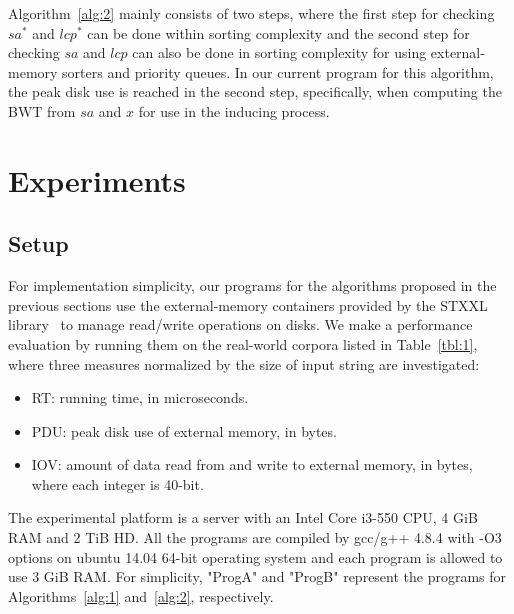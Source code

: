 \documentclass[10pt,journal,compsoc]{IEEEtran}
\begin{document}
Algorithm~\ref{alg:2} mainly consists of two steps, where the first step for checking $sa^*$ and $lcp^*$ can be done within sorting complexity and the second step for checking $sa$ and $lcp$ can also be done in sorting complexity for using external-memory sorters and priority queues. In our current program for this algorithm, the peak disk use is reached in the second step, specifically, when computing the BWT from $sa$ and $x$ for use in the inducing process.

\section{Experiments} \label{sec:experiment}

\subsection{Setup} \label{sec:experiment:setup}

For implementation simplicity, our programs for the algorithms proposed in the previous sections use the external-memory containers provided by the STXXL library~\cite{Dementiev2007} to manage read/write operations on disks. We make a performance evaluation by running them on the real-world corpora listed in Table~\ref{tbl:1}, where three measures normalized by the size of input string are investigated:

\begin{itemize}
	
	\item RT: running time, in microseconds.
	
	\item PDU: peak disk use of external memory, in bytes.
	
	\item IOV: amount of data read from and write to external memory, in bytes, where each integer is 40-bit.
	
\end{itemize}

The experimental platform is a server with an Intel Core i3-550 CPU, 4 GiB RAM and 2 TiB HD. All the programs are compiled by gcc/g++ 4.8.4 with -O3 options on ubuntu 14.04 64-bit operating system and each program is allowed to use 3 GiB RAM. For simplicity, "ProgA" and "ProgB" represent the programs for Algorithms~\ref{alg:1} and~\ref{alg:2}, respectively.
\end{document}
